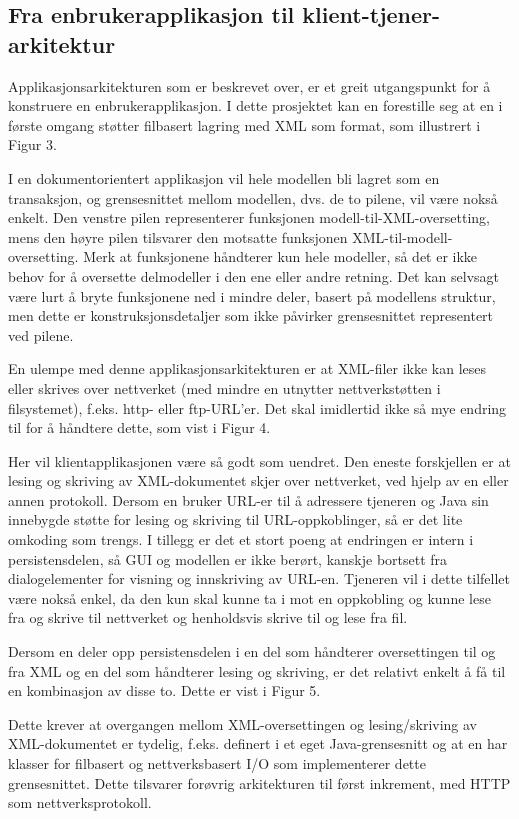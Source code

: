\subsection{Fra enbrukerapplikasjon til klient-tjener-arkitektur}

Applikasjonsarkitekturen som er beskrevet over, er et greit utgangspunkt for å konstruere en enbrukerapplikasjon. I dette prosjektet kan en forestille seg at en i første omgang støtter filbasert lagring med XML som format, som illustrert i Figur 3.

I en dokumentorientert applikasjon vil hele modellen bli lagret som en transaksjon, og grensesnittet mellom modellen, dvs. de to pilene, vil være nokså enkelt. Den venstre pilen representerer funksjonen modell-til-XML-oversetting, mens den høyre pilen tilsvarer den motsatte funksjonen XML-til-modell-oversetting. Merk at funksjonene håndterer kun hele modeller, så det er ikke behov for å oversette delmodeller i den ene eller andre retning. Det kan selvsagt være lurt å bryte funksjonene ned i mindre deler, basert på modellens struktur, men dette er konstruksjonsdetaljer som ikke påvirker grensesnittet representert ved pilene.

En ulempe med denne applikasjonsarkitekturen er at XML-filer ikke kan leses eller skrives over nettverket (med mindre en utnytter nettverkstøtten i filsystemet), f.eks. http- eller ftp-URL’er. Det skal imidlertid ikke så mye endring til for å håndtere dette, som vist i Figur 4.

Her vil klientapplikasjonen være så godt som uendret. Den eneste forskjellen er at lesing og skriving av XML-dokumentet skjer over nettverket, ved hjelp av en eller annen protokoll. Dersom en bruker URL-er til å adressere tjeneren og Java sin innebygde støtte for lesing og skriving til URL-oppkoblinger, så er det lite omkoding som trengs. I tillegg er det et stort poeng at endringen er intern i persistensdelen, så GUI og modellen er ikke berørt, kanskje bortsett fra dialogelementer for visning og innskriving av URL-en.
Tjeneren vil i dette tilfellet være nokså enkel, da den kun skal kunne ta i mot en oppkobling og kunne lese fra og skrive til nettverket og henholdsvis skrive til og lese fra fil.

Dersom en deler opp persistensdelen i en del som håndterer oversettingen til og fra XML og en del som håndterer lesing og skriving, er det relativt enkelt å få til en kombinasjon av disse to. Dette er vist i Figur 5.

Dette krever at overgangen mellom XML-oversettingen og lesing/skriving av XML-dokumentet er tydelig, f.eks. definert i et eget Java-grensesnitt og at en har klasser for filbasert og nettverksbasert I/O som implementerer dette grensesnittet. Dette tilsvarer forøvrig arkitekturen til først inkrement, med HTTP som nettverksprotokoll.

